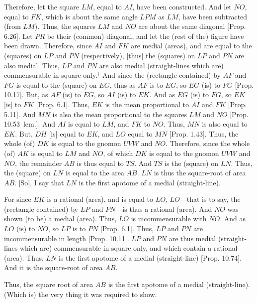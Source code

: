 \begin{Parallel}{}{}
{Therefore, let the square $LM$, equal to $AI$, have been constructed.
And let $NO$, equal to $FK$, which is about the
same angle $LPM$ as $LM$, have been subtracted (from $LM$).
Thus, the squares $LM$ and $NO$ are about the same diagonal
[Prop. 6.26]. Let $PR$ be their (common) diagonal, and
let the (rest of the) figure have been drawn. Therefore, since $AI$ and $FK$
are medial (areas), and are equal to the (squares) on $LP$ and $PN$
(respectively), [thus] the (squares) on $LP$ and $PN$ are also medial.
Thus, $LP$ and $PN$ are  also medial (straight-lines which are)
commensurable in square only.$^\dag$ And since the (rectangle contained) by
$AF$ and $FG$ is equal to the (square) on $EG$, thus as $AF$ is to $EG$, so $EG$ (is) to $FG$ [Prop. 10.17]. But, as
$AF$ (is) to $EG$, so $AI$ (is) to $EK$. And as $EG$ (is) to $FG$, so
$EK$ [is] to $FK$ [Prop. 6.1]. Thus, $EK$ is the mean proportional to $AI$ and $FK$ [Prop. 5.11].
And $MN$ is also the mean proportional to the squares $LM$ and $NO$ [Prop. 10.53~lem.]. 
And $AI$ is equal to $LM$, and $FK$ to $NO$. 
Thus, $MN$ is also equal to
$EK$. But, $DH$ [is] equal to $EK$, and $LO$ equal to $MN$ [Prop. 1.43]. Thus, the whole  (of) $DK$ is equal to
the gnomon $UVW$ and $NO$. Therefore, since the whole (of) $AK$
is equal to $LM$ and $NO$, of which $DK$ is equal to the
gnomon $UVW$ and $NO$,  the remainder $AB$ is thus equal to $TS$.
And $TS$ is the (square) on $LN$. Thus, the (square) on $LN$
is equal to the area $AB$. $LN$ is thus the square-root of area $AB$.
[So], I say that $LN$ is the first apotome of a medial (straight-line).

For since $EK$ is a rational (area), and is equal to $LO$, $LO$---that is to
say, the (rectangle contained) by $LP$ and $PN$---is thus
a rational (area). And $NO$ was shown (to be) a medial (area). Thus,
$LO$ is incommensurable  with $NO$. And as $LO$ (is) to $NO$,
so $LP$ is to $PN$ [Prop. 6.1]. Thus,  $LP$ and
$PN$ are incommensurable in length [Prop. 10.11]. 
$LP$ and $PN$ are thus medial (straight-lines which are) commensurable
in square only, and which contain a rational (area). Thus, $LN$ is the
first apotome of a medial (straight-line) [Prop. 10.74]. And it is the square-root of area $AB$.

Thus, the square root of area $AB$ is the first apotome of a medial (straight-line). (Which is) the very thing it was required to show.}
\end{Parallel}


\vspace{7pt}{\footnotesize\noindent$^\dag$ There is an error in the argument here. It should just say that $LP$ and $PN$ are commensurable in square,
rather than in square only, since $LP$ and $PN$ are only shown
to be incommensurable in length later on.}

